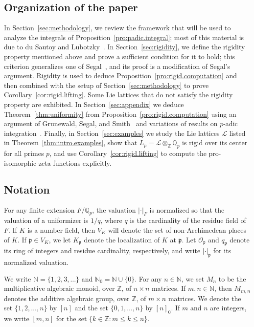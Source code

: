 \documentclass[11pt,a4paper]{amsart}
\theoremstyle{plain}
\theoremstyle{remark}
\newcommand{\N}{\mathbb{N}}
\newcommand{\Z}{\mathbb{Z}}
\newcommand{\Q}{\mathbb{Q}}
\newcommand{\tensor}{\otimes}
\newcommand{\p}{\mathfrak{p}}
\def \p {\ensuremath{\mathfrak{p}}}
\begin{document}
\subsection{Organization of the paper} 
In Section~\ref{sec:methodology}, we review the framework that will be used to analyze the integrals of Proposition~\ref{pro:padic.integral}; most of this material is due to du Sautoy and Lubotzky~\cite{duSLubotzky/96}.  In Section~\ref{sec:rigidity}, we define the rigidity property mentioned above and prove a sufficient condition for it to hold; this criterion generalizes one of Segal~\cite{Segal/89}, and its proof is a modification of Segal's argument.  Rigidity is used to deduce Proposition~\ref{pro:rigid.computation} and then combined with the setup of Section~\ref{sec:methodology} to prove Corollary~\ref{cor:rigid.lifting}.  
Some Lie lattices that do not satisfy the rigidity property are exhibited.  
In Section~\ref{sec:appendix} we deduce Theorem~\ref{thm:uniformity} from Proposition~\ref{pro:rigid.computation} using an argument of Grunewald, Segal, and Smith~\cite[\S2]{GSS/88} and variations of results on $p$-adic integration~\cite{BDOP/11, CluckersHalupczok/18}.
Finally, in Section~\ref{sec:examples} we study the Lie lattices $\mathcal{L}$ listed in Theorem~\ref{thm:intro.examples}, show that $L_p = \mathcal{L} \tensor_\Z \Q_p$ is rigid over its center for all primes $p$, and use Corollary~\ref{cor:rigid.lifting} to compute the pro-isomorphic zeta functions explicitly.  

\subsection{Notation}
For any finite extension $F / \Q_p$, the valuation $| \cdot |_F$ is normalized so that the valuation of a uniformizer is $1/q$, where $q$ is the cardinality of the residue field of $F$.  If $K$ is a number field, then $V_K$ will denote the set of non-Archimedean places of $K$.  If $\p \in V_K$, we let $K_\p$ denote the localization of $K$ at $\p$.  Let $\mathcal{O}_\p$ and $q_\p$ denote its ring of integers and residue cardinality, respectively, and write $|  \cdot  |_{\p}$ for its normalized valuation.

We write $\N = \{ 1, 2, 3, \dots \}$ and $\N_0 = \N \cup \{ 0 \}$.
For any $n \in \N$, we set $M_n$ to be the multiplicative algebraic monoid, over $\Z$, of $n \times n$ matrices.  If $m,n \in \N$, then $M_{m,n}$ denotes the additive algebraic group, over $\Z$, of $m \times n$ matrices.  We denote the set $\{ 1, 2, \dots, n \}$ by $[n]$ and the set $\{ 0, 1, \dots, n \}$ by $[n]_0$.  If $m$ and $n$ are integers, we write $[m,n]$ for the set $\{ k \in \Z : m \leq k \leq n \}$.
\end{document}
